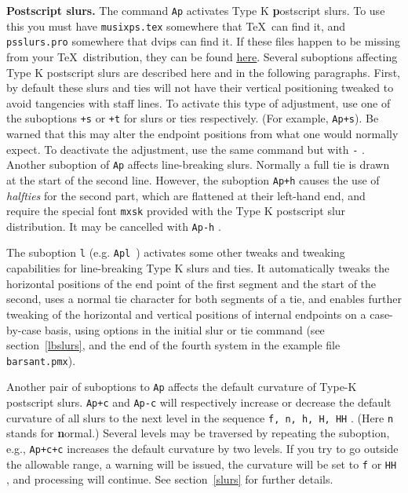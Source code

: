 \documentclass[11pt]{article}
\def\newfrom{2.59}  %
\def\NEW#1{\ifdim#1 pt<\newfrom pt\else%
\marginpar{\fbox{#1}}\fi}
\begin{document}
{\bf Postscript slurs.}
The \label{ApDirective}\NEW{2.4} command {\tt Ap} activates Type K 
{\bf p}ostscript slurs. To use this 
you must have {\tt musixps.tex} somewhere that \TeX~can find it, and 
{\tt psslurs.pro} somewhere that {\bfx dvips} can find it. 
If these files happen to be missing from your \TeX~distribution, they
can be found 
\href{http://www.icking-music-archive.org/software/musixtex/musixtex.zip}
{\underline{here}}.
Several suboptions affecting Type K 
postscript slurs are described here and in the following paragraphs. First, 
by default these slurs and ties will not have their vertical positioning tweaked
to avoid tangencies with staff lines.  To activate this type of adjustment,
use one of the suboptions {\tt +s} or {\tt +t} for
slurs or ties respectively.
(For example, {\tt Ap+s}). Be
warned that this may alter the endpoint positions from what one would normally
expect.  To deactivate the adjustment, use the same command but with {\tt -} .
Another suboption of {\tt Ap} affects line-breaking slurs. Normally a full tie 
is drawn at the start of the second line.  
However, the suboption {\tt Ap+h} causes the use of 
{\it{\bfi h}alfties} for the second part, which are flattened at their 
left-hand end, and require the 
special font {\tt mxsk} provided with the Type K postscript slur distribution. 
It may be cancelled with {\tt Ap-h} .

The \NEW{2.5} suboption {\tt l} (e.g. {\tt Apl}~) activates some other tweaks 
and tweaking capabilities for line-breaking Type K slurs and ties. It 
automatically tweaks the 
horizontal positions of the end point of the first segment and the start of the 
second, uses a normal tie character for both segments of a tie, and enables 
further tweaking of the horizontal and vertical positions of internal endpoints 
on a case-by-case basis, using options in the initial slur or tie command (see 
section~\ref{lbslurs}, and the end of the fourth system in the example file
{\tt barsant.pmx}).

Another pair of \NEW{2.5}suboptions to {\tt Ap} affects the default curvature of
Type-K postscript slurs. {\tt Ap+c} and {\tt Ap-c} will respectively increase or
decrease the default curvature of all slurs to the next level in the sequence 
{\tt f, n, h, H, HH} . (Here {\tt n} stands for {\bf n}ormal.)  Several levels 
may be traversed by repeating the suboption, e.g., {\tt Ap+c+c} increases the 
default curvature by two levels. If you try to 
go outside the allowable range, a warning will be issued, the curvature will be 
set to 
{\tt f} or {\tt HH} , and processing will continue. See section~\ref{slurs} for 
further details.
\end{document}
